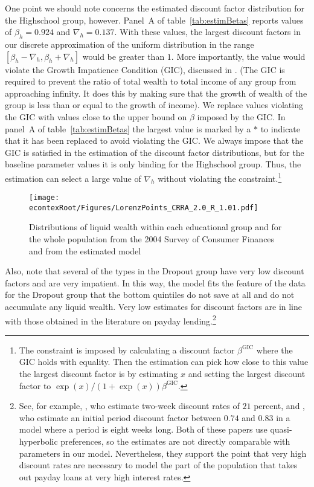 \documentclass[\econtexRoot/HAFiscal]{subfiles}
\begin{document}
One point we should note concerns the estimated discount factor distribution for the Highschool group, however. Panel~A of table~\ref{tab:estimBetas} reports values of $\beta_h=0.924$ and $\nabla_h=0.137$. With these values, the largest discount factors in our discrete approximation of the uniform distribution in the range $[\beta_h-\nabla_h, \beta_h+\nabla_h]$ would be greater than $1$. More importantly, the value would violate the Growth Impatience Condition (GIC), discussed in \cite{carroll2022theoretical}. (The GIC is required to prevent the ratio of total wealth to total income of any group from approaching infinity.  It does this by making sure that the growth of wealth of the group is less than or equal to the growth of income).  We replace values violating the GIC with values close to the upper bound on $\beta$ imposed by the GIC. In panel~A of table~\ref{tab:estimBetas} the largest value is marked by a $*$ to indicate that it has been replaced to avoid violating the GIC. We always impose that the GIC is satisfied in the estimation of the discount factor distributions, but for the baseline parameter values it is only binding for the Highschool group. Thus, the estimation can select a large value of $\nabla_h$ without violating the constraint.\footnote{The constraint is imposed by calculating a discount factor $\beta^{\text{GIC}}$ where the GIC holds with equality. Then the estimation can pick how close to this value the largest discount factor is by estimating $x$ and setting the largest discount factor to $\exp(x)/(1+\exp(x)) \beta^{\text{GIC}}$.} 

\begin{figure}[th]
  \begin{center}
    \texttt{[image: \\econtexRoot/Figures/LorenzPoints\_CRRA\_2.0\_R\_1.01.pdf]}
    \caption{Distributions of liquid wealth within each educational group and for the whole population from the 2004 Survey of Consumer Finances and from the estimated model}
    \notinsubfile{\label{fig:LorenzPts}}
  \end{center}
\end{figure}

Also, note that several of the types in the Dropout group have very low discount factors and are very impatient. In this way, the model fits the feature of the data for the Dropout group that the bottom quintiles do not save at all and do not accumulate any liquid wealth. Very low estimates for discount factors are in line with those obtained in the literature on payday lending.\footnote{See, for example, \cite{skiba2008payday}, who estimate two-week discount rates of $21$ percent, and \cite{allcott2021high}, who estimate an initial period discount factor between $0.74$ and $0.83$ in a model where a period is eight weeks long. Both of these papers use quasi-hyperbolic preferences, so the estimates are not directly comparable with parameters in our model. Nevertheless, they support the point that very high discount rates are necessary to model the part of the population that takes out payday loans at very high interest rates.} 
\end{document}
